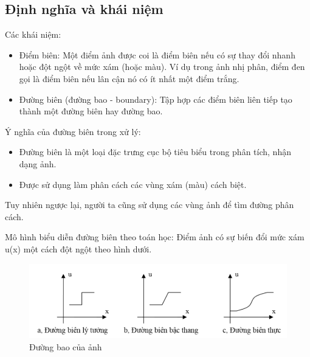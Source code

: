 \documentclass[../report.tex]{subfiles}
\begin{document}
\subsection{Định nghĩa và khái niệm}
Các khái niệm: 
\begin{itemize}
\item Điểm biên: Một điểm ảnh được coi là điểm biên 
nếu có sự thay đổi nhanh hoặc đột ngột về mức xám (hoặc màu). 
Ví dụ trong ảnh nhị phân, điểm đen gọi là điểm biên 
nếu lân cận nó có ít nhất một điểm trắng.  \cite{slide} \cite{bookhvbc}

\item Đường biên (đường bao - boundary): Tập hợp các 
điểm biên liên tiếp tạo thành một đường biên hay đường bao.  
\end{itemize}

\noindent Ý nghĩa của đường biên trong xử lý: 
\begin{itemize}
\item Đường biên là một loại đặc trưng cục bộ tiêu biểu 
trong phân tích, nhận dạng ảnh. 
\item Được sử dụng làm phân cách các vùng xám (màu) cách biệt. 
\end{itemize}

\noindent Tuy nhiên ngược lại, người ta cũng 
sử dụng các vùng ảnh để tìm đường phân cách.

Mô hình biểu diễn đường biên theo toán học: Điểm ảnh có sự biến đổi mức xám u(x) một cách đột ngột theo hình dưới. 
\begin{figure}[H]
\centering
\includegraphics[width=\textwidth]{figures/edges.png}
\caption{Đường bao của ảnh}
\end{figure}
\end{document}
